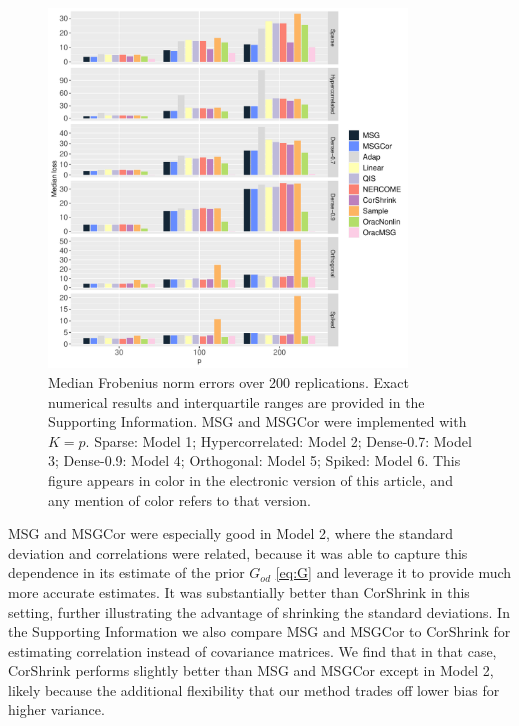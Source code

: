 \documentclass[useAMS,referee,usenatbib]{biom}
\begin{document}
\begin{figure}
\begin{center}
\centerline{  \includegraphics[width=0.85\textwidth]{img/sim2_frobenius.pdf}}
\end{center}
\caption{Median Frobenius norm errors over 200 replications. Exact numerical results and interquartile ranges are provided in the Supporting Information. MSG and MSGCor were implemented with $K = p$. Sparse: Model 1; Hypercorrelated: Model 2; Dense-0.7: Model 3; Dense-0.9: Model 4; Orthogonal: Model 5; Spiked: Model 6. This figure appears in color in the electronic version of this article, and any mention of color refers to that version.}
\label{fig:sim2_frobenius}
\end{figure}

MSG and MSGCor were especially good in Model 2, where the standard deviation and correlations were related, because it was able to capture this dependence in its estimate of the prior $G_{od}$ \eqref{eq:G} and leverage it to provide much more accurate estimates. It was substantially better than CorShrink in this setting, further illustrating the advantage of shrinking the standard deviations. In the Supporting Information we also compare MSG and MSGCor to CorShrink for estimating correlation instead of covariance matrices. We find that in that case, CorShrink performs slightly better than MSG and MSGCor except in Model 2, likely because the additional flexibility that our method trades off lower bias for higher variance.
\end{document}
